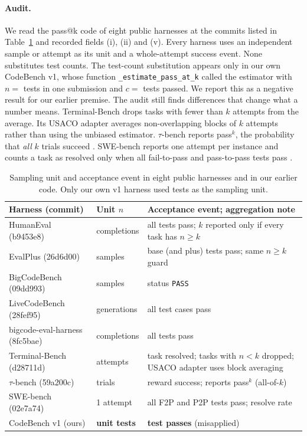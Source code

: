 \documentclass[11pt,a4paper]{article}
\begin{document}
\paragraph{Audit.}
We read the pass@k code of eight public harnesses at the commits listed in Table~\ref{tab:audit} and recorded fields (i), (ii) and (v). Every harness uses an independent sample or attempt as its unit and a whole-attempt success event. None substitutes test counts. The test-count substitution appears only in our own CodeBench v1, whose function \texttt{\_estimate\_pass\_at\_k} called the estimator with $n=$ tests in one submission and $c=$ tests passed. We report this as a negative result for our earlier premise. The audit still finds differences that change what a number means. Terminal-Bench drops tasks with fewer than $k$ attempts from the average. Its USACO adapter averages non-overlapping blocks of $k$ attempts rather than using the unbiased estimator. $\tau$-bench reports pass$^k$, the probability that \emph{all} $k$ trials succeed \citep{yao2025taubench}. SWE-bench reports one attempt per instance and counts a task as resolved only when all fail-to-pass and pass-to-pass tests pass \citep{jimenez2024swebench}.

\begin{table}[htbp]
  \centering
  \small
  \begin{tabularx}{\linewidth}{@{}l l X@{}}
    \toprule
    Harness (commit) & Unit $n$ & Acceptance event; aggregation note \\
    \midrule
    HumanEval \citep{chen2021codex} (b9453e8) & completions & all tests pass; $k$ reported only if every task has $n\ge k$ \\
    EvalPlus \citep{liu2023evalplus} (26d6d00) & samples & base (and plus) tests pass; same $n\ge k$ guard \\
    BigCodeBench \citep{zhuo2025bigcodebench} (09dd993) & samples & status \texttt{PASS} \\
    LiveCodeBench \citep{jain2024livecodebench} (28fef95) & generations & all test cases pass \\
    bigcode-eval-harness \citep{bigcodeharness} (8fc5bae) & completions & all tests pass \\
    Terminal-Bench \citep{terminalbench} (d28711d) & attempts & task resolved; tasks with $n<k$ dropped; USACO adapter uses block averaging \\
    $\tau$-bench \citep{yao2025taubench} (59a200c) & trials & reward success; reports pass$^k$ (all-of-$k$) \\
    SWE-bench \citep{jimenez2024swebench} (02e7a74) & 1 attempt & all F2P and P2P tests pass; resolve rate \\
    \midrule
    CodeBench v1 (ours) & \textbf{unit tests} & \textbf{test passes} (misapplied) \\
    \bottomrule
  \end{tabularx}
  \caption{Sampling unit and acceptance event in eight public harnesses and in our earlier code. Only our own v1 harness used tests as the sampling unit.}
  \label{tab:audit}
\end{table}
\end{document}
